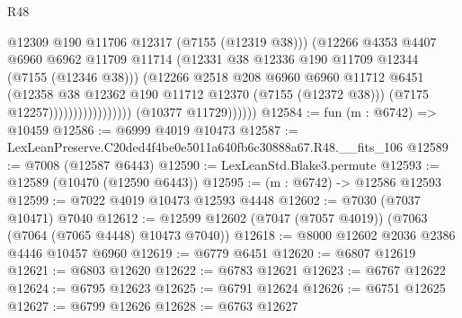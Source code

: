 \begin{lexlean}{R48}
\begin{coremodule}
                                            @12309
                                            @190
                                            @11706
                                            @12317
                                            (@7155 (@12319 @38)))
                                          (@12266
                                            @4353
                                            @4407
                                            @6960
                                            @6962
                                            @11709
                                            @11714
                                            (@12331
                                              @38
                                              @12336
                                              @190
                                              @11709
                                              @12344
                                              (@7155 (@12346 @38)))
                                            (@12266
                                              @2518
                                              @208
                                              @6960
                                              @6960
                                              @11712
                                              @6451
                                              (@12358
                                                @38
                                                @12362
                                                @190
                                                @11712
                                                @12370
                                                (@7155 (@12372 @38)))
                                              (@7175 @12257)))))))))))))))))
              (@10377 @11729))))))
@12584 := fun (m : @6742) => @10459
@12586 := @6999 @4019 @10473
@12587 := LexLeanPreserve.C20ded4f4be0e5011a640fb6c30888a67.R48.__fits_106
@12589 := @7008 (@12587 @6443)
@12590 := LexLeanStd.Blake3.permute
@12593 := @12589 (@10470 (@12590 @6443))
@12595 := (m : @6742) -> @12586 @12593
@12599 := @7022 @4019 @10473 @12593 @4448
@12602 := @7030 (@7037 @10471) @7040
@12612 := @12599 @12602 (@7047 (@7057 @4019)) (@7063 (@7064 (@7065 @4448) @10473 @7040))
@12618 := @8000 @12602 @2036 @2386 @4446 @10457 @6960
@12619 := @6779 @6451
@12620 := @6807 @12619
@12621 := @6803 @12620
@12622 := @6783 @12621
@12623 := @6767 @12622
@12624 := @6795 @12623
@12625 := @6791 @12624
@12626 := @6751 @12625
@12627 := @6799 @12626
@12628 := @6763 @12627

\end{coremodule}
\end{lexlean}
